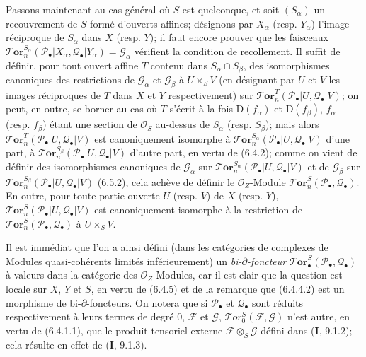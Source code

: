 \begin{env}[6.5.3]
Passons maintenant au cas général où $S$ est quelconque, et soit $(S_\alpha)$
un recouvrement de $S$ formé d'ouverts affines; désignons par $X_\alpha$
(resp. $Y_\alpha$) l'image réciproque de $S_\alpha$ dans $X$ (resp. $Y$); il
faut encore prouver que les faisceaux
$\boldsymbol{\mathscr{T}\!or}_n^{S_\alpha}
  (\mathscr P_\bullet|X_\alpha,\mathscr Q_\bullet|Y_\alpha)
  =\mathscr G_\alpha$
vérifient la condition de recollement. Il suffit de définir, pour tout ouvert
affine $T$ contenu dans $S_\alpha\cap S_\beta$, des isomorphismes canoniques des
restrictions de $\mathscr G_\alpha$ et $\mathscr G_\beta$ à $U\times_S V$ (en
désignant par $U$ et $V$ les images réciproques de $T$ dans $X$ et $Y$
respectivement) sur
$\boldsymbol{\mathscr{T}\!or}_n^T(\mathscr P_\bullet|U,\mathscr Q_\bullet|V)$; on peut, en
outre, se borner au cas où $T$ s'écrit à la fois $\mathrm D(f_\alpha)$ et
$\mathrm D(f_\beta)$, $f_\alpha$ (resp. $f_\beta$) étant une section de
$\mathscr O_S$ au-dessus de $S_\alpha$ (resp. $S_\beta$); mais alors
$\boldsymbol{\mathscr{T}\!or}_n^T(\mathscr P_\bullet|U,\mathscr Q_\bullet|V)$ est
canoniquement isomorphe à
$\boldsymbol{\mathscr{T}\!or}_n^{S_\alpha}(\mathscr P_\bullet|U,\mathscr Q_\bullet|V)$
d'une part, à
$\boldsymbol{\mathscr{T}\!or}_n^{S_\beta}(\mathscr P_\bullet|U,\mathscr Q_\bullet|V)$
d'autre part, en vertu de (6.4.2); comme on vient de définir des isomorphismes
canoniques de $\mathscr G_\alpha$ sur
$\boldsymbol{\mathscr{T}\!or}_n^{S_\alpha}(\mathscr P_\bullet|U,\mathscr Q_\bullet|V)$ et
de $\mathscr G_\beta$ sur
$\boldsymbol{\mathscr{T}\!or}_n^{S_\beta}(\mathscr P_\bullet|U,\mathscr Q_\bullet|V)$
(6.5.2), cela achève de définir le $\mathscr O_Z$-Module
$\boldsymbol{\mathscr{T}\!or}_n^S(\mathscr P_\bullet,\mathscr Q_\bullet)$. En outre, pour
toute partie ouverte $U$ (resp. $V$) de $X$ (resp. $Y$),
$\boldsymbol{\mathscr{T}\!or}_n^S(\mathscr P_\bullet|U,\mathscr Q_\bullet|V)$ est
canoniquement isomorphe à la restriction de
$\boldsymbol{\mathscr{T}\!or}_n^S(\mathscr P_\bullet,\mathscr Q_\bullet)$ à $U\times_S V$.

Il est immédiat que l'on a ainsi défini (dans les catégories de complexes de
Modules quasi-cohérents limités inférieurement) un \emph{bi-$\partial$-foncteur}
$\boldsymbol{\mathscr{T}\!or}_\bullet^S(\mathscr P_\bullet,\mathscr Q_\bullet)$ à valeurs
dans la catégorie des $\mathscr O_Z$-Modules, car il est clair que la question
est locale sur $X$, $Y$ et $S$, en vertu de (6.4.5) et de la remarque que
(6.4.4.2) est un morphisme de bi-$\partial$-foncteurs. On notera que si
$\mathscr P_\bullet$ et $\mathscr Q_\bullet$ sont réduits respectivement à
leurs termes de degré 0, $\mathscr F$ et $\mathscr G$,
$\mathscr{T}\!or_0^S(\mathscr F,\mathscr G)$ n'est autre, en vertu de
(6.4.1.1), que le produit tensoriel externe $\mathscr F\otimes_S\mathscr G$
défini dans (\textbf{I}, 9.1.2); cela résulte en effet de (\textbf{I}, 9.1.3).
\end{env}

